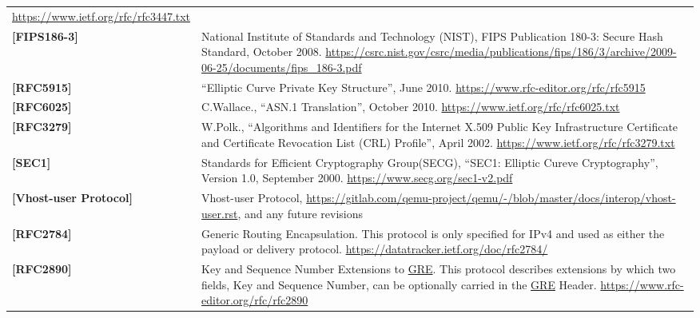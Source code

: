 \begin{longtable}{l p{5in}}
	\newline\url{https://www.ietf.org/rfc/rfc3447.txt}\\
	\label{intro:NIST}\textbf{[FIPS186-3]} &
     National Institute of Standards and Technology (NIST), FIPS Publication 180-3: Secure Hash Standard, October 2008.
	\newline\url{https://csrc.nist.gov/csrc/media/publications/fips/186/3/archive/2009-06-25/documents/fips_186-3.pdf}\\
	\label{intro:rfc5915}\textbf{[RFC5915]} &
    ``Elliptic Curve Private Key Structure'', June 2010.
	\newline\url{https://www.rfc-editor.org/rfc/rfc5915}\\
	\label{intro:rfc6025}\textbf{[RFC6025]} &
    C.Wallace., ``ASN.1 Translation'', October 2010.
	\newline\url{https://www.ietf.org/rfc/rfc6025.txt}\\
	\label{intro:rfc3279}\textbf{[RFC3279]} &
    W.Polk., ``Algorithms and Identifiers for the Internet X.509 Public Key Infrastructure Certificate and Certificate Revocation List (CRL) Profile'', April 2002.
	\newline\url{https://www.ietf.org/rfc/rfc3279.txt}\\
	\label{intro:SEC1}\textbf{[SEC1]} &
    Standards for Efficient Cryptography Group(SECG), ``SEC1: Elliptic Cureve Cryptography'', Version 1.0, September 2000.
	\newline\url{https://www.secg.org/sec1-v2.pdf}\\
	\label{intro:Vhost-user Protocol}\textbf{[Vhost-user Protocol]} &
    Vhost-user Protocol,
        \newline\url{https://gitlab.com/qemu-project/qemu/-/blob/master/docs/interop/vhost-user.rst}, and any future revisions\\
	\label{intro:rfc2784}\textbf{[RFC2784]} &
    Generic Routing Encapsulation. This protocol is only specified for IPv4 and used as either the payload or delivery protocol.
	\newline\url{https://datatracker.ietf.org/doc/rfc2784/}\\
	\label{intro:rfc2890}\textbf{[RFC2890]} &
    Key and Sequence Number Extensions to \hyperref[intro:rfc2784]{GRE}. This protocol describes extensions by which two fields, Key and
    Sequence Number, can be optionally carried in the \hyperref[intro:rfc2784]{GRE} Header.
	\newline\url{https://www.rfc-editor.org/rfc/rfc2890}\\

\end{longtable}
